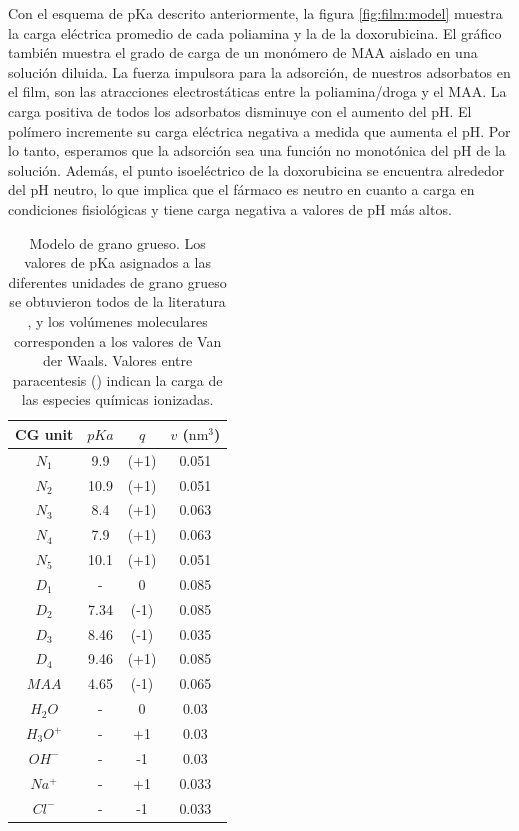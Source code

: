 Con el esquema de pKa descrito anteriormente, la figura \ref{fig:film:model} muestra la carga el\'ectrica promedio de cada poliamina y la de la doxorubicina. El gr\'afico tambi\'en muestra el grado de carga de un mon\'omero de MAA aislado en una soluci\'on diluida. La fuerza impulsora para la adsorci\'on, de nuestros adsorbatos en el film,  son las atracciones electrost\'aticas entre la poliamina/droga y el MAA. La carga positiva de todos los adsorbatos disminuye con el aumento del pH. El pol\'imero incremente su carga el\'ectrica negativa  a medida que aumenta el pH. Por lo tanto, esperamos que la adsorci\'on sea una funci\'on no monot\'onica del pH de la soluci\'on. Adem\'as, el punto isoel\'ectrico de la doxorubicina se encuentra alrededor del pH neutro, lo que implica que el f\'armaco es neutro en cuanto a carga en condiciones fisiol\'ogicas y tiene carga negativa a valores de pH m\'as altos.



\begin{table}[!ht]
	\begin{centering}
		\centering
		\setlength{\tabcolsep}{2.2pt}
		\begin{tabular}{|cccc|}
			\hline 
			\hspace{0pt}CG unit   & $pKa$ & $q$  & $v$ ($\text{nm}^3$)  \\ \hline
			$N_1$& 9.9 & (+1) &0.051\\
			$N_2$& 10.9& (+1) & 0.051\\ 
		     $N_3$& 8.4& (+1)& 0.063\\
		     $N_4$&7.9& (+1) & 0.063\\
		     $N_5$& 10.1& (+1)& 0.051\\
		      $D_1$&  - & 0 &0.085\\
		     $D_2$& 7.34 & (-1) & 0.085\\ 
			 $D_3$&  8.46& (-1)& 0.035\\
			$D_4$&  9.46 & (+1) &0.085\\ 
			$MAA$&  4.65 & (-1) & 0.065\\
			$H_2O$ & - & 0 & 0.03\\
			$H_3O^+$ & - & +1 & 0.03\\
			$OH^-$ & - & -1 & 0.03\\
			$Na^+$ & - & +1 & 0.033\\ 
			$Cl^-$ & - & -1 & 0.033\\ \hline
		\end{tabular}		
		\caption{Modelo de grano grueso. Los valores de pKa asignados a las diferentes unidades de grano grueso se obtuvieron todos de la literatura \cite{agostinelli2010polyamines,casero2009recent,puchem}, y los vol\'umenes moleculares corresponden a los valores de Van der Waals. Valores entre paracentesis () indican la carga de las especies qu\'imicas ionizadas.}
		\label{table:CG}
	\end{centering}
\end{table}


